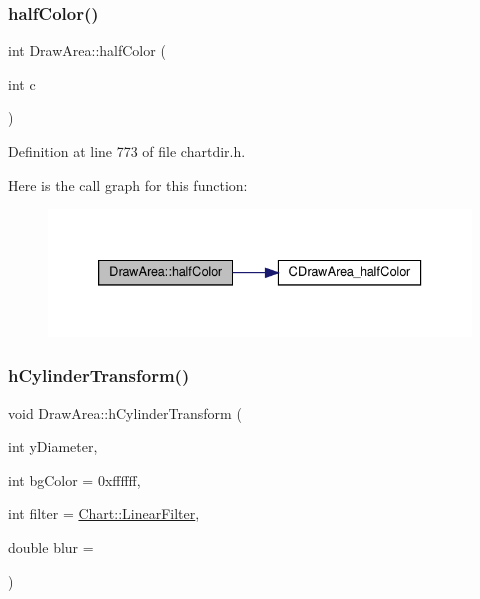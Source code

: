 \subsubsection{\texorpdfstring{half\+Color()}{halfColor()}}
{\footnotesize\ttfamily int Draw\+Area\+::half\+Color (\begin{DoxyParamCaption}\item[{int}]{c }\end{DoxyParamCaption})\hspace{0.3cm}{\ttfamily [inline]}}



Definition at line 773 of file chartdir.\+h.

Here is the call graph for this function\+:
\nopagebreak
\begin{figure}[H]
\begin{center}
\leavevmode
\includegraphics[width=333pt]{class_draw_area_a8fbf62770f095f2cebf2f006a47b691f_cgraph}
\end{center}
\end{figure}
\mbox{\label{class_draw_area_aea6c02fec02392ac6d9dc1f3d663c7e3}} 
\subsubsection{\texorpdfstring{h\+Cylinder\+Transform()}{hCylinderTransform()}}
{\footnotesize\ttfamily void Draw\+Area\+::h\+Cylinder\+Transform (\begin{DoxyParamCaption}\item[{int}]{y\+Diameter,  }\item[{int}]{bg\+Color = {\ttfamily 0xffffff},  }\item[{int}]{filter = {\ttfamily \hyperlink{namespace_chart_ab75b9aa1781d0e0159ef1d441b577764a8cd729b7a982bac2dce8b021511e3ac6}{Chart\+::\+Linear\+Filter}},  }\item[{double}]{blur = {} }\end{DoxyParamCaption})\hspace{0.3cm}{\ttfamily [inline]}}



